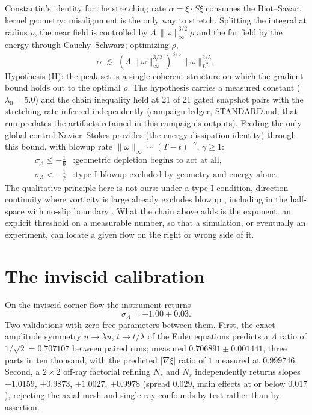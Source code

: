 \documentclass[11pt]{article}
\newcommand{\om}{\omega}
\newcommand{\vinf}{\|\om\|_\infty}
\newcommand{\Lam}{\Lambda}
\newcommand{\sL}{\sigma_{\!\Lambda}}
\begin{document}
Constantin's identity for the stretching rate $\alpha=\xi\!\cdot\! S\xi$
consumes the Biot--Savart kernel geometry: misalignment is the only way to
stretch. Splitting the integral at radius $\rho$, the near field is
controlled by $\Lam\,\vinf^{3/2}\rho$ and the far field by the energy
through Cauchy--Schwarz; optimizing $\rho$,
\begin{equation}
\alpha \;\lesssim\;
\left(\Lam\,\vinf^{3/2}\right)^{3/5}\|\om\|_{L^2}^{2/5}.
\end{equation}
Hypothesis (H): the peak set is a single coherent structure on which the
gradient bound holds out to the optimal $\rho$. The hypothesis carries a
measured constant ($\lambda_0=5.0$) and the chain inequality held at 21
of 21 gated snapshot pairs with the stretching rate inferred independently
(campaign ledger, STANDARD.md; that run predates the artifacts retained in
this campaign's outputs). Feeding the only global control Navier--Stokes provides
(the energy dissipation identity) through this bound, with blowup rate
$\vinf\sim(T-t)^{-\gamma}$, $\gamma\ge1$:
\begin{align}
\sL\le-\tfrac16 &: \text{geometric depletion begins to act at all,}\\
\sL<-\tfrac12 &: \text{type-I blowup excluded by geometry and energy alone.}
\end{align}
The qualitative principle here is not ours: under a type-I condition,
direction continuity where vorticity is large already excludes blowup
\cite{GM11}, including in the half-space with no-slip boundary
\cite{BP20}. What the chain above adds is the exponent: an explicit
threshold on a measurable number, so that a simulation, or eventually an
experiment, can locate a given flow on the right or wrong side of it.

\section{The inviscid calibration}\label{sec:inviscid}

On the inviscid corner flow the instrument returns
\begin{equation}
\sL = +1.00 \pm 0.03.
\end{equation}
Two validations with zero free parameters between them. First, the exact
amplitude symmetry $u\to\lambda u$, $t\to t/\lambda$ of the Euler
equations predicts a $\Lam$ ratio of $1/\sqrt2=0.707107$ between paired
runs; measured $0.706891\pm0.001441$, three parts in ten thousand, with
the predicted $|\nabla\xi|$ ratio of $1$ measured at $0.999746$. Second, a
$2\times2$ off-ray factorial refining $N_z$ and $N_r$ independently
returns slopes $+1.0159$, $+0.9873$, $+1.0027$, $+0.9978$ (spread $0.029$,
main effects at or below $0.017$), rejecting the axial-mesh and
single-ray confounds by test rather than by assertion.
\end{document}
